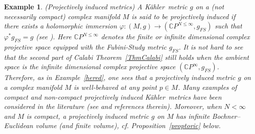 \documentclass[12pt]{amsart}
\newcommand{\C}{\mathbb{C}}
\newcommand{\K}{K\"{a}hler}
\newtheorem{ex}{Example}
\begin{document}
\begin{ex}\rm (Projectively induced metrics)\label{projindnoncomp}\label{projindwb}
	A \K\ metric $g$ on a (not necessarily compact) complex manifold $M$ is said to be  {\em projectively induced} if there exists a holomorphic immersion $\varphi: (M, g)\rightarrow (\C P^{N\leq \infty}, g_{FS})$ such that $\varphi^*g_{FS}=g$ (see \cite{Calabi53Isometric}). 
	Here $\C P^{N\leq \infty}$ denotes the  finite or infinite dimensional complex projective space equipped with the Fubini-Study metric $g_{FS}$. 
	It  is not hard to see that the second part of Calabi Theorem~\ref{ThmCalabi} still holds when the ambient space is  the infinite  dimensional complex projective space $(\C P^{\infty}, g_{FS})$.
	Therefore, as in Example~\ref{hered}, one sees that a projectively induced metric $g$ on a complex manifold $M$ is well-behaved at any point $p\in M$. 
	Many examples of compact and non-compact projectively induced \K\ metrics have been considered in the literature (see \cite{Loi18Book} and references therein).
	Moreover, when $N<\infty$ and $M$ is compact, a projectively induced metric $g$ on $M$ has infinite Bochner--Euclidean volume (and finite volume), cf. Proposition~\ref{proptoric} below.
\end{ex}
\end{document}
